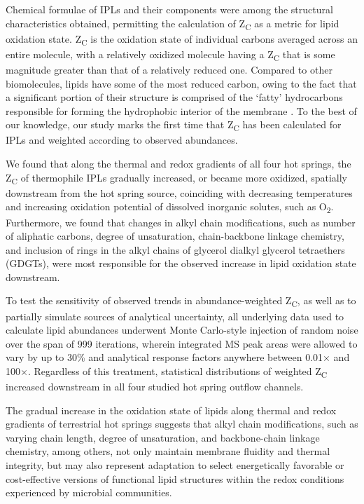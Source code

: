 Chemical formulae of IPLs and their components were among the structural characteristics obtained, permitting the calculation of Z\textsubscript{C} as a metric for lipid oxidation state. Z\textsubscript{C} is the oxidation state of individual carbons averaged across an entire molecule, with a relatively oxidized molecule having a Z\textsubscript{C} that is some magnitude greater than that of a relatively reduced one. Compared to other biomolecules, lipids have some of the most reduced carbon, owing to the fact that a significant portion of their structure is comprised of the `fatty' hydrocarbons responsible for forming the hydrophobic interior of the membrane \citep{likens2010biogeochemistry}. To the best of our knowledge, our study marks the first time that Z\textsubscript{C} has been calculated for IPLs and weighted according to observed abundances.


We found that along the thermal and redox gradients of all four hot springs, the Z\textsubscript{C} of thermophile IPLs gradually increased, or became more oxidized, spatially downstream from the hot spring source, coinciding with decreasing temperatures and increasing oxidation potential of dissolved inorganic solutes, such as O\textsubscript{2}. Furthermore, we found that changes in alkyl chain modifications, such as number of aliphatic carbons, degree of unsaturation, chain-backbone linkage chemistry, and inclusion of rings in the alkyl chains of glycerol dialkyl glycerol tetraethers (GDGTs), were most responsible for the observed increase in lipid oxidation state downstream.

To test the sensitivity of observed trends in abundance-weighted Z\textsubscript{C}, as well as to partially simulate sources of analytical uncertainty, all underlying data used to calculate lipid abundances underwent Monte Carlo-style injection of random noise over the span of 999 iterations, wherein integrated MS peak areas were allowed to vary by up to 30\% and analytical response factors anywhere between 0.01$\times$ and 100$\times$. Regardless of this treatment, statistical distributions of weighted Z\textsubscript{C} increased downstream in all four studied hot spring outflow channels.

The gradual increase in the oxidation state of lipids along thermal and redox gradients of terrestrial hot springs suggests that alkyl chain modifications, such as varying chain length, degree of unsaturation, and backbone-chain linkage chemistry, among others, not only maintain membrane fluidity and thermal integrity, but may also represent adaptation to select energetically favorable or cost-effective versions of functional lipid structures within the redox conditions experienced by microbial communities.

